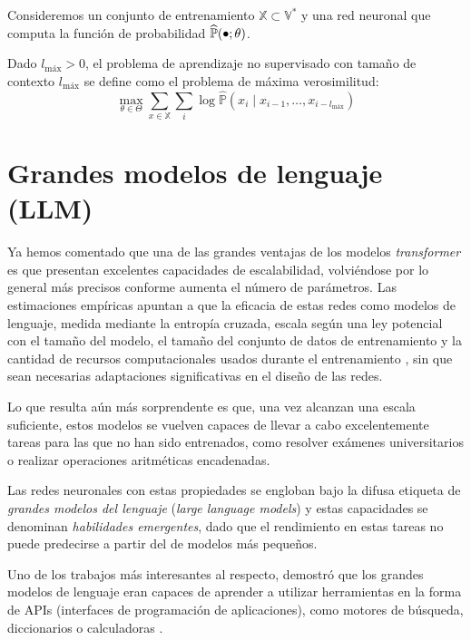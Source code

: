 \begin{definition}
    Consideremos un conjunto de entrenamiento \( \mathbb{X} \subset \mathbb{V}^* \) y una red neuronal que computa la función de probabilidad \( \widehat{\mathbb{P}}(\smallbullet; \theta) \). 
    
    Dado \( l_\text{máx} > 0 \), el problema de aprendizaje no supervisado con tamaño de contexto \( l_\text{máx} \) se define como el problema de máxima verosimilitud:
    \[
        \max_{\theta \in \Theta} \sum_{x \in \mathbb{X}} \sum_i \log \widehat{\mathbb{P}} \left(x_{i} \mid x_{i-1}, …, x_{i-l_\text{máx}} \right)
    \]
\end{definition}

\section{Grandes modelos de lenguaje (LLM)}
Ya hemos comentado que una de las grandes ventajas de los modelos \textit{transformer} es que presentan excelentes capacidades de escalabilidad, volviéndose por lo general más precisos conforme aumenta el número de parámetros. Las estimaciones empíricas apuntan a que la eficacia de estas redes como modelos de lenguaje, medida mediante la entropía cruzada, escala según una ley potencial con el tamaño del modelo, el tamaño del conjunto de datos de entrenamiento y la cantidad de recursos computacionales usados durante el entrenamiento \cite{kaplan2020scaling}, sin que sean necesarias adaptaciones significativas en el diseño de las redes.

Lo que resulta aún más sorprendente es que, una vez alcanzan una escala suficiente, estos modelos se vuelven capaces de llevar a cabo excelentemente tareas para las que no han sido entrenados, como resolver exámenes universitarios o realizar operaciones aritméticas encadenadas. 

Las redes neuronales con estas propiedades se engloban bajo la difusa etiqueta de \textit\textit{grandes modelos del lenguaje} (\textit{large language models}) y estas capacidades se denominan \textit{habilidades emergentes}, dado que el rendimiento en estas tareas no puede predecirse a partir del de modelos más pequeños.

Uno de los trabajos más interesantes al respecto, demostró que los grandes modelos de lenguaje eran capaces de aprender a utilizar herramientas en la forma de APIs (interfaces de programación de aplicaciones), como motores de búsqueda, diccionarios o calculadoras \cite{schick2023toolformer}.

